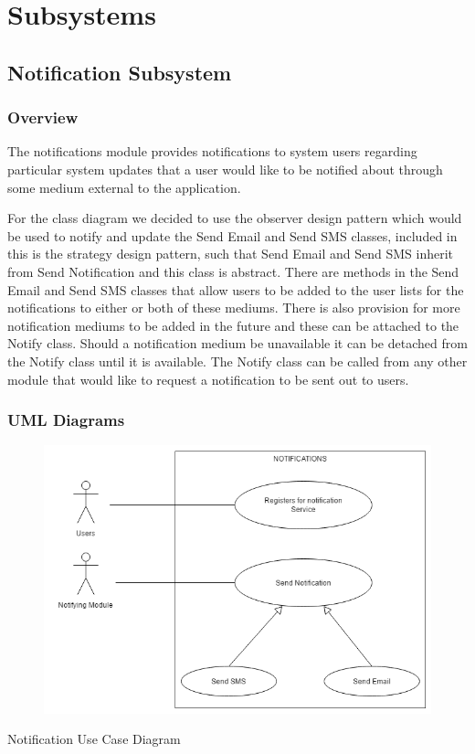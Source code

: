 \documentclass{article}
\begin{document}
\section{Subsystems}
\subsection{Notification Subsystem}
\subsubsection{Overview}
The notifications module provides notifications to system users regarding
particular system updates that a user would like to be notified about through
some medium external to the application.
\begin{flushleft}
For the class diagram we decided to use the observer design pattern which would be used to notify and update the Send Email and Send SMS classes, included in this is the strategy design pattern, such that Send Email and Send SMS inherit from Send Notification and this class is abstract. There are methods in the Send Email and Send SMS classes that allow users to be added to the user lists for the notifications to either or both of these mediums. There is also provision for more notification mediums to be added in the future and these can be attached to the Notify class. Should a notification medium be unavailable it can be detached from the Notify class until it is available. The Notify class can be called from any other module that would like to request a notification to be sent out to users.
\end{flushleft}

\subsubsection{UML Diagrams}	
\begin{figure}[h!]
  \includegraphics[width=\textwidth]{Notifications_Use_Case.png}
\end{figure}
Notification Use Case Diagram
\end{document}
